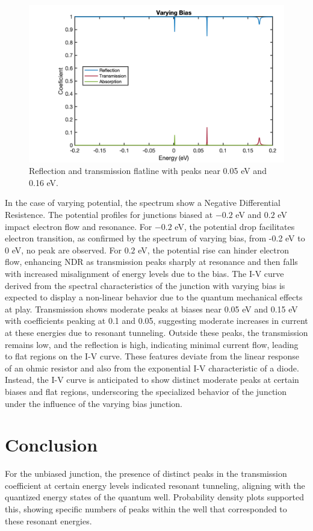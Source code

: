 \documentclass[twocolumn]{article}[ht]
\begin{document}
\begin{figure}[ht]
    \centering
    \hspace{-1cm}
    \includegraphics[width=0.9\linewidth]{varying_bias.png}
    \caption{Reflection and transmission flatline with peaks near 0.05 eV and 0.16 eV.}
    \label{fig:example-9}
\end{figure}

In the case of varying potential, the spectrum show a Negative Differential Resistence. The potential profiles for junctions biased at \(-0.2\) eV and \(0.2\) eV impact electron flow and resonance. For \(-0.2\) eV, the potential drop facilitates electron transition, as confirmed by the spectrum of varying bias, from -0.2 eV to 0 eV, no peak are observed. For \(0.2\) eV, the potential rise can hinder electron flow, enhancing NDR as transmission peaks sharply at resonance and then falls with increased misalignment of energy levels due to the bias.
The I-V curve derived from the spectral characteristics of the junction with varying bias is expected to display a non-linear behavior due to the quantum mechanical effects at play. Transmission shows moderate peaks at biases near 0.05 eV and 0.15 eV with coefficients peaking at 0.1 and 0.05, suggesting moderate increases in current at these energies due to resonant tunneling. Outside these peaks, the transmission remains low, and the reflection is high, indicating minimal current flow, leading to flat regions on the I-V curve. These features deviate from the linear response of an ohmic resistor and also from the exponential I-V characteristic of a diode. Instead, the I-V curve is anticipated to show distinct moderate peaks at certain biases and flat regions, underscoring the specialized behavior of the junction under the influence of the varying bias junction.

\section{Conclusion}
For the unbiased junction, the presence of distinct peaks in the transmission coefficient at certain energy levels indicated resonant tunneling, aligning with the quantized energy states of the quantum well. Probability density plots supported this, showing specific numbers of peaks within the well that corresponded to these resonant energies.
\end{document}
